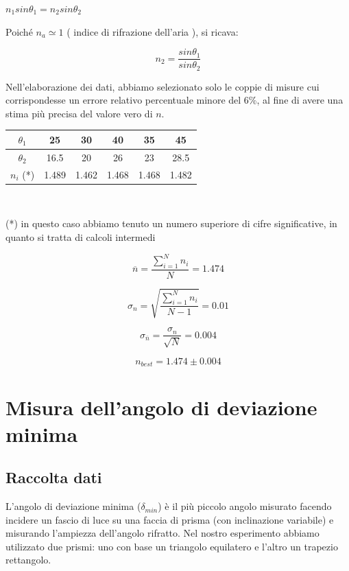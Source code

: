 \documentclass[a4paper,10pt]{report}
\begin{document}
\begin{center}
$n_1 sin\theta_1 = n_2 sin\theta_2$
\end{center}

Poiché $n_a \simeq1 $ ( indice di rifrazione dell'aria ), si ricava:

$$n_2 = \frac{sin\theta_1}{sin\theta_2}$$

Nell'elaborazione dei dati, abbiamo selezionato solo le coppie di misure cui corrispondesse un errore relativo percentuale minore del 6\%, al fine di avere una stima più precisa del valore vero di $n$.\\
\begin{center}


\begin{tabular}{c|c|c|c|c|c}
\textbf{$\theta_1$} & 25 & 30 & 40 & 35 & 45\\
\midrule
\textbf{$\theta_2$} & 16.5 & 20 & 26 & 23 & 28.5\\
\midrule
\textbf{$n_i$} (*) & 1.489 & 1.462 & 1.468 & 1.468 & 1.482\\
\end{tabular}\\

\end{center}
(*) in questo caso abbiamo tenuto un numero superiore di cifre significative, in quanto si tratta di calcoli intermedi 

$$\overline{n} = \frac{\displaystyle\sum\limits_{i=1}^N n_i}{N} = 1.474 $$

$$\sigma_n = \sqrt{\frac{\sum_{i=1}^N n_i}{N-1}} = 0.01$$

$$\sigma_{\overline{n}} = \frac{\sigma_n}{\sqrt{N}} = 0.004$$

$$n_{best} = 1.474  \pm 0.004 $$


\section{Misura dell'angolo di deviazione minima}
\subsection{Raccolta dati}

L'angolo di deviazione minima ($\delta_{min}$) è il più piccolo angolo misurato facendo incidere un fascio di luce su una faccia di prisma (con inclinazione variabile) e misurando l'ampiezza dell'angolo rifratto. Nel nostro esperimento abbiamo utilizzato due prismi: uno con base un triangolo equilatero e l'altro un trapezio rettangolo.
\end{document}
